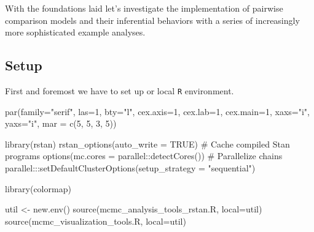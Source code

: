 \documentclass[
  letterpaper,
  DIV=11,
  numbers=noendperiod]{scrartcl}
\newenvironment{Shaded}{\begin{snugshade}}{\end{snugshade}}
\newcommand{\AttributeTok}[1]{\textcolor[rgb]{0.40,0.45,0.13}{#1}}
\newcommand{\CommentTok}[1]{\textcolor[rgb]{0.37,0.37,0.37}{#1}}
\newcommand{\ConstantTok}[1]{\textcolor[rgb]{0.56,0.35,0.01}{#1}}
\newcommand{\DecValTok}[1]{\textcolor[rgb]{0.68,0.00,0.00}{#1}}
\newcommand{\FunctionTok}[1]{\textcolor[rgb]{0.28,0.35,0.67}{#1}}
\newcommand{\NormalTok}[1]{\textcolor[rgb]{0.00,0.23,0.31}{#1}}
\newcommand{\OtherTok}[1]{\textcolor[rgb]{0.00,0.23,0.31}{#1}}
\newcommand{\SpecialCharTok}[1]{\textcolor[rgb]{0.37,0.37,0.37}{#1}}
\newcommand{\StringTok}[1]{\textcolor[rgb]{0.13,0.47,0.30}{#1}}
\begin{document}
With the foundations laid let's investigate the implementation of
pairwise comparison models and their inferential behaviors with a series
of increasingly more sophisticated example analyses.

\subsection{Setup}\label{setup}

First and foremost we have to set up or local \texttt{R} environment.

\begin{Shaded}
\begin{Highlighting}[]
\FunctionTok{par}\NormalTok{(}\AttributeTok{family=}\StringTok{"serif"}\NormalTok{, }\AttributeTok{las=}\DecValTok{1}\NormalTok{, }\AttributeTok{bty=}\StringTok{"l"}\NormalTok{,}
    \AttributeTok{cex.axis=}\DecValTok{1}\NormalTok{, }\AttributeTok{cex.lab=}\DecValTok{1}\NormalTok{, }\AttributeTok{cex.main=}\DecValTok{1}\NormalTok{,}
    \AttributeTok{xaxs=}\StringTok{"i"}\NormalTok{, }\AttributeTok{yaxs=}\StringTok{"i"}\NormalTok{, }\AttributeTok{mar =} \FunctionTok{c}\NormalTok{(}\DecValTok{5}\NormalTok{, }\DecValTok{5}\NormalTok{, }\DecValTok{3}\NormalTok{, }\DecValTok{5}\NormalTok{))}
\end{Highlighting}
\end{Shaded}

\begin{Shaded}
\begin{Highlighting}[]
\FunctionTok{library}\NormalTok{(rstan)}
\FunctionTok{rstan\_options}\NormalTok{(}\AttributeTok{auto\_write =} \ConstantTok{TRUE}\NormalTok{)            }\CommentTok{\# Cache compiled Stan programs}
\FunctionTok{options}\NormalTok{(}\AttributeTok{mc.cores =}\NormalTok{ parallel}\SpecialCharTok{::}\FunctionTok{detectCores}\NormalTok{()) }\CommentTok{\# Parallelize chains}
\NormalTok{parallel}\SpecialCharTok{:::}\FunctionTok{setDefaultClusterOptions}\NormalTok{(}\AttributeTok{setup\_strategy =} \StringTok{"sequential"}\NormalTok{)}

\FunctionTok{library}\NormalTok{(colormap)}
\end{Highlighting}
\end{Shaded}

\begin{Shaded}
\begin{Highlighting}[]
\NormalTok{util }\OtherTok{\textless{}{-}} \FunctionTok{new.env}\NormalTok{()}
\FunctionTok{source}\NormalTok{(}\StringTok{\textquotesingle{}mcmc\_analysis\_tools\_rstan.R\textquotesingle{}}\NormalTok{, }\AttributeTok{local=}\NormalTok{util)}
\FunctionTok{source}\NormalTok{(}\StringTok{\textquotesingle{}mcmc\_visualization\_tools.R\textquotesingle{}}\NormalTok{, }\AttributeTok{local=}\NormalTok{util)}
\end{Highlighting}
\end{Shaded}
\end{document}
